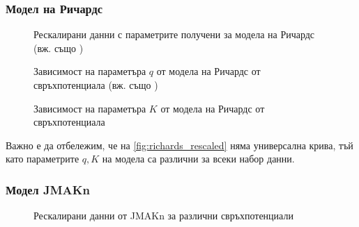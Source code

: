 \subsubsection{Модел на Ричардс}
\begin{figure}[hbpt]
    \centering
    \caption{Рескалирани данни с параметрите получени за модела на Ричардс (вж. също \cite{VikiPHD2023} \cite{ivanmarkovpreprint})}
    \label{fig:richards_rescaled}
\end{figure}
\begin{figure}[H]
    \centering
    \caption{Зависимост на параметъра $q$ от модела на Ричардс от свръхпотенциала (вж. също \cite{VikiPHD2023} \cite{ivanmarkovpreprint})}
\end{figure}
\begin{figure}[H]
    \centering
    \caption{Зависимост на параметъра $K$ от модела на Ричардс от свръхпотенциала}
\end{figure}

Важно е да отбележим, че на \autoref{fig:richards_rescaled} няма универсална крива, тъй като параметрите $q, K$ на модела са различни за всеки набор данни.
\subsubsection{Модел JMAKn}
\begin{figure}[H]
    \centering
    \caption{Рескалирани данни от JMAKn за различни свръхпотенциали}
\end{figure}

